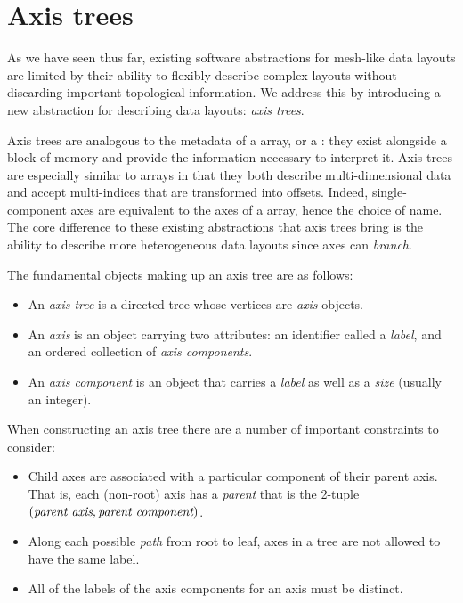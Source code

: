\documentclass[thesis]{subfiles}
\begin{document}
\chapter{Axis trees}
\label{chapter:axis_trees}

As we have seen thus far, existing software abstractions for mesh-like data layouts are limited by their ability to flexibly describe complex layouts without discarding important topological information.
We address this by introducing a new abstraction for describing data layouts: \emph{axis trees}.

Axis trees are analogous to the metadata of a \numpy{} array, or a  : they exist alongside a block of memory and provide the information necessary to interpret it.
Axis trees are especially similar to \numpy{} arrays in that they both describe multi-dimensional data and accept multi-indices that are transformed into offsets.
Indeed, single-component axes are equivalent to the axes of a \numpy{} array, hence the choice of name.
The core difference to these existing abstractions that axis trees bring is the ability to describe more heterogeneous data layouts since axes can \emph{branch}.

The fundamental objects making up an axis tree are as follows:
\begin{itemize}
  \item
    An \emph{axis tree} is a directed tree whose vertices are \emph{axis} objects.
  \item
    An \emph{axis} is an object carrying two attributes: an identifier called a \emph{label}, and an ordered collection of \emph{axis components}.
  \item
    An \emph{axis component} is an object that carries a \emph{label} as well as a \emph{size} (usually an integer).
\end{itemize}

When constructing an axis tree there are a number of important constraints to consider:
\begin{itemize}
  \item
    Child axes are associated with a particular component of their parent axis.
    That is, each (non-root) axis has a \emph{parent} that is the 2-tuple $(\textnormal{\it parent axis}, \textnormal{\it parent component})$.
  \item
    Along each possible \emph{path} from root to leaf, axes in a tree are not allowed to have the same label.
  \item
    All of the labels of the axis components for an axis must be distinct.
\end{itemize}
\end{document}
